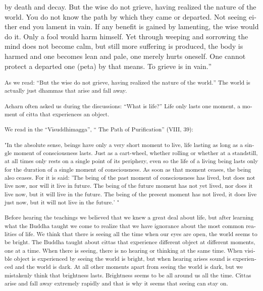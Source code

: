 {{by death and decay. But the wise do not}\textdutch{
}\textenglish[variant=american]{grieve, having realized the nature of
the world. You do not know the path by}\textdutch{
}\textenglish[variant=american]{which they came or departed. Not seeing
either end you lament in vain. If an}\textdutch{y
}\textenglish[variant=american]{benefit is gained by lamenting, the wise
would do it. Only a fool would harm}\textdutch{
}\textenglish[variant=american]{himself. Yet through weeping and
sorrowing the mind does not become calm, but}\textdutch{
}\textenglish[variant=american]{still more suffering is produced, the
body is harmed and one becomes lean and}\textdutch{
}\textenglish[variant=american]{pale, one merely hurts oneself. One
cannot protect a departed one (peta) by that}\textdutch{
}\textenglish[variant=american]{means. To grieve is in
vain.}\textdutch{''}}

\textsuperscript{\textdutch{As we read:
``}\textenglish[variant=american]{But the wise do not}\textdutch{
}\textenglish[variant=american]{grieve, having realized the nature of
the world.}\textdutch{'' The world is actually just dhammas that arise
and fall away. }}

\textsuperscript{\textdutch{Acharn often asked us during the
discussions: ``What is life?'' Life only lasts one moment, a moment of
citta that experiences an object.}}

\textsuperscript{\textdutch{We read in the ``Visuddhimagga'', `` The
Path of Purification'' (}VIII, 39\textdutch{): }}

\textsuperscript{\textenglish[variant=american]{"In the absolute sense,
beings have only a very short moment to live, life lasting as long as a
single moment of consciousness lasts. Just as a cart-wheel, whether
rolling or whether at a standstill, at all times only rests on a single
point of its periphery, even so the life of a living being lasts only
for the duration of a single moment of consciousness. As soon as that
moment ceases, the being also ceases. For it is said: 'The being of the
past moment of consciousness has lived, but does not live now, nor will
it live in future. The being of the future moment has not yet lived, nor
does it live now, but it will live in the future. The being of the
present moment has not lived, it does live just now, but it will not
live in the future.}\textdutch{' "}}

\textsuperscript{\textdutch{Before hearing the teachings we believed
that we knew a great deal about life, but after learning what the Buddha
taught we come to realize that we have ignorance about the most common
realities of life. We think that there is seeing all the time when our
eyes are open, the world seems to be bright. The Buddha taught about
cittas that experience different object at different moments, one at a
time. When there is seeing, there is no hearing or thinking at the same
time. When visible object is experienced by seeing the world is bright,
but when hearing arises sound is experienced and the world is dark. At
all other moments apart from seeing the world is dark, but we mistakenly
think that brightness lasts. Brightness seems to be all around us all
the time. Cittas arise and fall away extremely rapidly and that is why
it seems that seeing can stay on. }}


